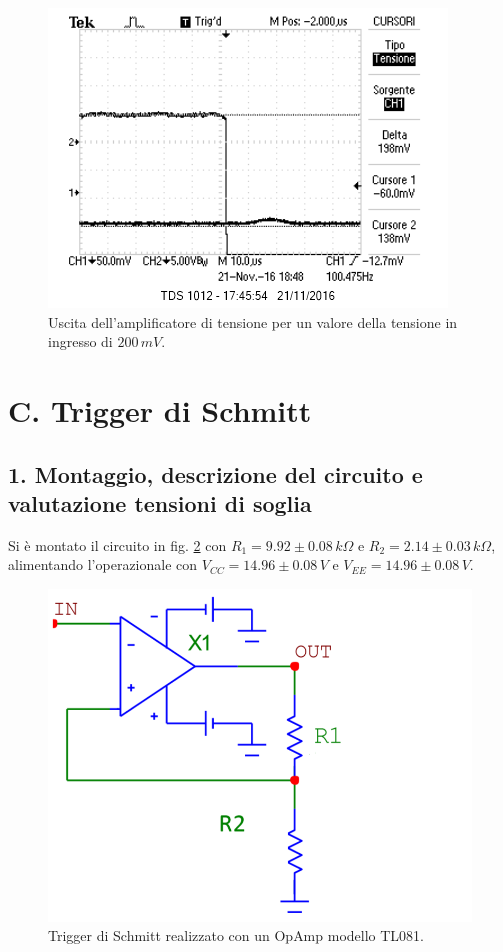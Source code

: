 \documentclass[10pt,a4paper]{article}
\begin{document}
\begin{figure}[htb!]
\centering
\includegraphics[scale=1.0]{immagini/morto.png}
\caption{Uscita dell'amplificatore di tensione per un valore della tensione in ingresso di $200 \, mV$.}
\label{morto}
\end{figure}

\section*{C. Trigger di Schmitt}
\subsection{1. Montaggio, descrizione del circuito e valutazione tensioni di soglia}
Si è montato il circuito in fig. \ref{circuito3} con $R_1 = 9.92\pm0.08 \, k\Omega$ e $R_2 = 2.14 \pm 0.03 \, k\Omega$, alimentando l'operazionale con $V_{CC} = 14.96\pm0.08 \, V$ e $V_{EE} = 14.96 \pm 0.08 \, V$.\\

\begin{figure}[htb!]
\centering
\includegraphics[scale=0.5]{triggerSchmitt.png}
\caption{Trigger di Schmitt realizzato con un OpAmp modello TL081.\label{circuito3}}
\end{figure}
\end{document}
